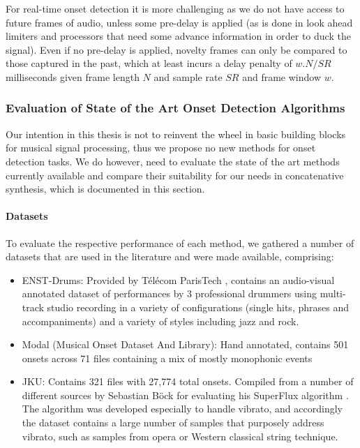 For real-time onset detection it is more challenging as we do not have access to future frames of audio, unless some pre-delay is applied (as is done in look ahead limiters and processors that need some advance information in order to duck the signal). Even if no pre-delay is applied, novelty frames can only be compared to those captured in the past, which at least incurs a delay penalty of $w.N/SR$ milliseconds given frame length $N$ and sample rate $SR$ and frame window $w$.

\subsubsection{Evaluation of State of the Art Onset Detection Algorithms}

Our intention in this thesis is not to reinvent the wheel in basic building blocks for  musical signal processing, thus we propose no new methods for onset detection tasks. We do however, need to evaluate the state of the art methods currently available and compare their suitability for our needs in concatenative synthesis, which is documented in this section.

\paragraph{Datasets}

To evaluate the respective performance of each method, we gathered a number of datasets that are used in the literature and were made available, comprising:

\begin{itemize}
  \item ENST-Drums: Provided by Télécom ParisTech \citep{Gillet2006}, contains an audio-visual annotated dataset of performances by 3 professional drummers using multi-track studio recording in a variety of configurations (single hits, phrases and accompaniments) and a variety of styles including jazz and rock. 
  \item Modal (Musical Onset Dataset And Library): Hand annotated, contains 501 onsets across 71 files containing a mix of mostly monophonic events \citep{Glover2011}
  \item JKU: Contains 321 files with 27,774 total onsets. Compiled from a number of different sources by Sebastian Böck for evaluating his SuperFlux algorithm \citep{Bock2013}. The algorithm was developed especially to handle vibrato, and accordingly the dataset contains a large number of samples that purposely address vibrato, such as samples from opera or Western classical string technique.
\end{itemize}

